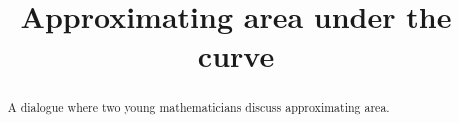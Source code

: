\documentclass{ximera}
\title[Break-Ground:]{Approximating area under the curve}
\begin{document}
\begin{abstract}
A dialogue where two young mathematicians discuss approximating area.
\end{abstract}
\maketitle





\end{document}
